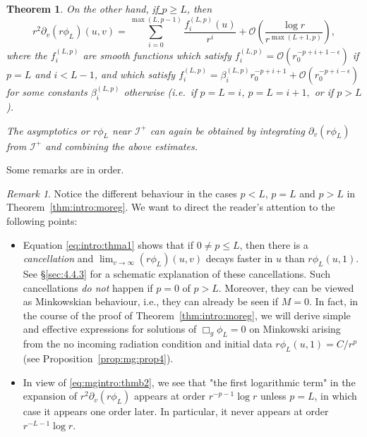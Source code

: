 \documentclass[11pt,english]{article}
\numberwithin{equation}{section}
\newtheorem{thm}{Theorem}[section]
\theoremstyle{remark}
\newtheorem{rem}{Remark}[section]
\theoremstyle{plain}
\theoremstyle{remark}
\newcommand{\pv}{\partial_v}
\renewcommand{\(}{\left(}
\renewcommand{\)}{\right)}
\begin{document}
\begin{thm}
	On the other hand, \underline{if $p\geq L$}, then 
	\begin{equation}\label{eq:mgintro:thmb2}
	r^2\pv(r\phi_L)(u,v)=\sum_{i=0}^{\max(L,p-1)}\frac{f^{(L,p)}_i(u)}{r^i}+\mathcal O\left(\frac{\log r}{r^{\max(L+1,p)}}\right),
	\end{equation}
	where the $f^{(L,p)}_i$ are smooth functions which satisfy $f^{(L,p)}_i=\mathcal O(r_0^{-p+i+1-\epsilon})$ if $p=L$ and $i<L-1$, and which satisfy $f^{(L,p)}_i=\beta_i^{(L,p)}r_0^{-p+i+1}+\mathcal O(r_0^{-p+i-\epsilon})$ for some constants $\beta_i^{(L,p)}$ otherwise (i.e.\ if $p=L=i$, $p=L=i+1,$ or if $p>L$).
	
	The asymptotics or $r\phi_L$ near $\mathcal I^+$ can again be obtained by integrating $\pv(r\phi_L)$ from $\mathcal I^+$ and combining the above estimates.
	\end{thm}
Some remarks are in order.
\begin{rem}\label{rem:intro:cancel}
Notice the different behaviour in the cases $p<L$, $p=L$ and $p>L$ in Theorem~\ref{thm:intro:moreg}. We want to direct the reader's attention to the following points:
\begin{itemize}
	\item Equation \eqref{eq:intro:thma1} shows that if $0\neq p\leq L$, then there is a \textit{cancellation}  and $\lim_{v\to\infty}(r\phi_L)(u,v)$ decays faster in $u$ than $r\phi_L(u,1)$.
	See \S\ref{sec:4.4.3} for a schematic explanation of these cancellations.
	 Such cancellations \textit{do not} happen if $p=0$ of $p>L$. 
	Moreover, they can be viewed as Minkowskian behaviour, i.e., they can already be seen if $M=0$.
	 In fact, in the course of the proof of Theorem~\ref{thm:intro:moreg}, we will derive simple and effective expressions for solutions of $\Box_g\phi_L=0$ on Minkowski arising from the no incoming radiation condition and initial data $r\phi_L(u,1)=C/r^p$ (see Proposition~\ref{prop:mg:prop4}).
	\item In view of \eqref{eq:mgintro:thmb2}, we see that "the first logarithmic term" in the expansion of $r^2\pv(r\phi_L)$ appears at order $r^{-p-1}\log r$ unless $p=L$, in which case it appears one order later. In particular, it never appears at order $r^{-L-1}\log r$.
\end{itemize}
\end{rem}
\end{document}
